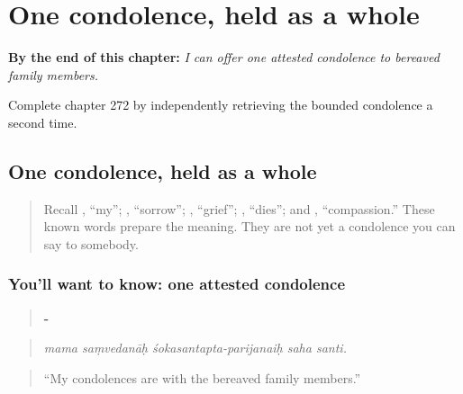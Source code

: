 
\chapter{One condolence, held as a whole}
\label{ch:sa-bounded-condolence}

\begin{chapteropening}
\textbf{By the end of this chapter:} \emph{I can offer one attested condolence to bereaved family members.}

Complete chapter 272 by independently retrieving the bounded condolence a second time.
\end{chapteropening}

\section[\texorpdfstring{\sk{मम} \sk{संवेदनाः} … (mama saṃvedanāḥ …)}{मम संवेदनाः … (mama saṃvedanāḥ …)}]{One condolence, held as a whole}

\label{lesson:SA-C272-offer-condolence}



\begin{quote}
Recall \textbf{}, “my”; \textbf{}, “sorrow”; \textbf{}, “grief”; \textbf{}, “dies”; and \textbf{}, “compassion.” These known words prepare the meaning. They are not yet a condolence you can say to somebody.
\end{quote}

\subsection*{You'll want to know: one attested condolence}
\begin{quote}
\textbf{  -  }
\end{quote}

\begin{quote}
\emph{mama saṃvedanāḥ śokasantapta-parijanaiḥ saha santi.}
\end{quote}

\begin{quote}
“My condolences are with the bereaved family members.”
\end{quote}

